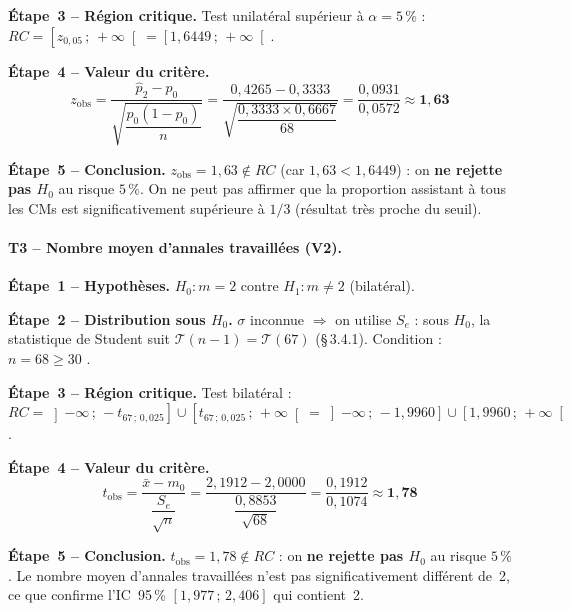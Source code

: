 \textbf{Étape~3 -- Région critique.}
Test unilatéral supérieur à $\alpha = 5\,\%$ :
$RC = \left[z_{0{,}05}\,;\,+\infty\right[ = \left[1{,}6449\,;\,+\infty\right[$.

\textbf{Étape~4 -- Valeur du critère.}
\[
  z_\text{obs}
  = \frac{\hat{p}_2 - p_0}{\sqrt{\dfrac{p_0(1-p_0)}{n}}}
  = \frac{0{,}4265 - 0{,}3333}{\sqrt{\dfrac{0{,}3333 \times 0{,}6667}{68}}}
  = \frac{0{,}0931}{0{,}0572}
  \approx \mathbf{1{,}63}
\]

\textbf{Étape~5 -- Conclusion.}
$z_\text{obs} = 1{,}63 \notin RC$ (car $1{,}63 < 1{,}6449$) :
on \textbf{ne rejette pas $H_0$} au risque $5\,\%$.
On ne peut pas affirmer que la proportion assistant à tous les CMs est
significativement supérieure à $1/3$ (résultat très proche du seuil).

\paragraph{T3 -- Nombre moyen d'annales travaillées (V2).}

\textbf{Étape~1 -- Hypothèses.}
$H_0 : m = 2$ contre $H_1 : m \neq 2$ (bilatéral).

\textbf{Étape~2 -- Distribution sous $H_0$.}
$\sigma$ inconnue $\Rightarrow$ on utilise $S_e$ : sous $H_0$,
la statistique de Student suit $\mathcal{T}(n-1) = \mathcal{T}(67)$ (§\,3.4.1).
Condition : $n = 68 \geq 30$ {\checkmark}.

\textbf{Étape~3 -- Région critique.}
Test bilatéral : $RC = \left]-\infty\,;\,-t_{67\,;\,0{,}025}\right] \cup \left[t_{67\,;\,0{,}025}\,;\,+\infty\right[
= \left]-\infty\,;\,-1{,}9960\right] \cup \left[1{,}9960\,;\,+\infty\right[$.

\textbf{Étape~4 -- Valeur du critère.}
\[
  t_\text{obs}
  = \frac{\bar{x} - m_0}{\dfrac{S_e}{\sqrt{n}}}
  = \frac{2{,}1912 - 2{,}0000}{\dfrac{0{,}8853}{\sqrt{68}}}
  = \frac{0{,}1912}{0{,}1074}
  \approx \mathbf{1{,}78}
\]

\textbf{Étape~5 -- Conclusion.}
$t_\text{obs} = 1{,}78 \notin RC$ :
on \textbf{ne rejette pas $H_0$} au risque $5\,\%$.
Le nombre moyen d'annales travaillées n'est pas significativement différent de~2,
ce que confirme l'IC~95\,\% $[1{,}977\,;\,2{,}406]$ qui contient~2.
